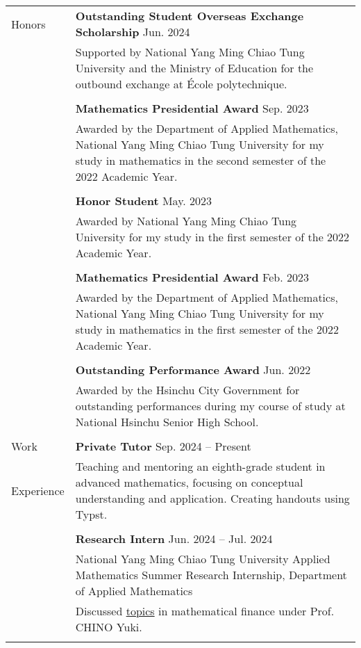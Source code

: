 \documentclass[letterpaper, 11pt]{article}
\begin{document}
\begin{center}
\begin{longtable}{p{0.76in}p{5.93in}}
        {\textcolor{OliveGreen}{Honors}} & \textbf{Outstanding Student Overseas Exchange Scholarship} \hfill Jun. 2024\\
        & Supported by National Yang Ming Chiao Tung University and the Ministry of Education for the outbound exchange at \'Ecole polytechnique. \\
        & \\
        & \textbf{Mathematics Presidential Award} \hfill Sep. 2023\\
        & Awarded by the Department of Applied Mathematics, National Yang Ming Chiao Tung University for my study in mathematics in the second semester of the 2022 Academic Year.\\
        & \\
        & \textbf{Honor Student} \hfill May. 2023\\
        & Awarded by National Yang Ming Chiao Tung University for my study in the first semester of the 2022 Academic Year. \\
        & \\
        & \textbf{Mathematics Presidential Award} \hfill Feb. 2023\\
        & Awarded by the Department of Applied Mathematics, National Yang Ming Chiao Tung University for my study in mathematics in the first semester of the 2022 Academic Year.\\
        & \\
        & \textbf{Outstanding Performance Award} \hfill Jun. 2022\\
        & Awarded by the Hsinchu City Government for outstanding performances during my course of study at National Hsinchu Senior High School.\\
        & \\
        
        
        {\textcolor{OliveGreen}{Work}} & \textbf{Private Tutor} \hfill Sep. 2024 -- Present \\
        {\textcolor{OliveGreen}{Experience}} & Teaching and mentoring an eighth-grade student in advanced mathematics, focusing on conceptual understanding and application. Creating handouts using Typst.\\
        & \\

        & \textbf{Research Intern} \hfill Jun. 2024 -- Jul. 2024 \\
        & National Yang Ming Chiao Tung University Applied Mathematics Summer Research Internship, Department of Applied Mathematics\\
        & Discussed \href{https://hackmd.io/@eiken-sc11/B1QcaW3B0}{topics} in mathematical finance under Prof. CHINO Yuki.\\
        & \\


\end{longtable}
\end{center}
\end{document}
